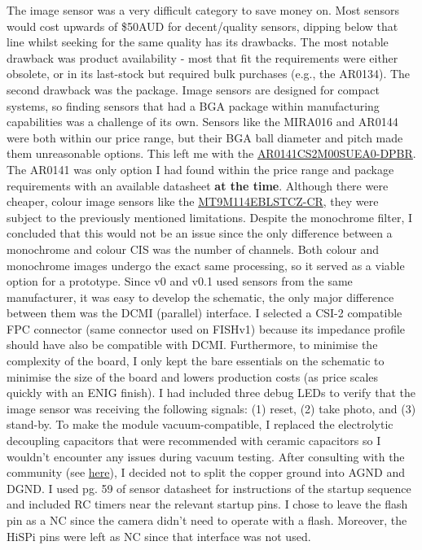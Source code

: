 The image sensor was a very difficult category to save money on. Most sensors would cost upwards of \$50AUD for decent/quality sensors, dipping below that line whilst seeking for the same quality has its drawbacks. The most notable drawback was product availability - most that fit the requirements were either obsolete, or in its last-stock but required bulk purchases (e.g., the AR0134). The second drawback was the package. Image sensors are designed for compact systems, so finding sensors that had a BGA package within manufacturing capabilities was a challenge of its own. Sensors like the MIRA016 and AR0144 were both within our price range, but their BGA ball diameter and pitch made them unreasonable options. This left me with the \href{https://www.digikey.com.au/en/products/detail/onsemi/AR0141CS2M00SUEA0-DPBR/7221099}{AR0141CS2M00SUEA0-DPBR}. The AR0141 was only option I had found within the price range and package requirements with an available datasheet \textbf{at the time}. Although there were cheaper, colour image sensors like the \href{https://www.digikey.com.au/en/products/detail/onsemi/MT9M114EBLSTCZ-CR/5321744}{MT9M114EBLSTCZ-CR}, they were subject to the previously mentioned limitations. Despite the monochrome filter, I concluded that this would not be an issue since the only difference between a monochrome and colour CIS was the number of channels. Both colour and monochrome images undergo the exact same processing, so it served as a viable option for a prototype.
\nl
Since v0 and v0.1 used sensors from the same manufacturer, it was easy to develop the schematic, the only major difference between them was the DCMI (parallel) interface. I selected a CSI-2 compatible FPC connector (same connector used on FISHv1) because its impedance profile should have also be compatible with DCMI. Furthermore, to minimise the complexity of the board, I only kept the bare essentials on the schematic to minimise the size of the board and lowers production costs (as price scales quickly with an ENIG finish).
\nl
I had included three debug LEDs to verify that the image sensor was receiving the following signals: (1) reset, (2) take photo, and (3) stand-by.
\nl
To make the module vacuum-compatible, I replaced the electrolytic decoupling capacitors that were recommended with ceramic capacitors so I wouldn't encounter any issues during vacuum testing. After consulting with the community (see \href{https://www.reddit.com/r/PCB/comments/1orpjwe/comment/nnrqqf0/?context=1}{here}), I decided not to split the copper ground into AGND and DGND. I used pg. 59 of sensor datasheet for instructions of the startup sequence and included RC timers near the relevant startup pins. I chose to leave the flash pin as a NC since the camera didn't need to operate with a flash. Moreover, the HiSPi pins were left as NC since that interface was not used.
